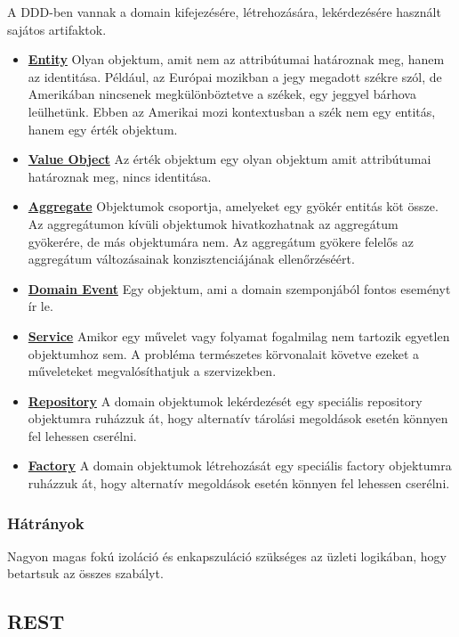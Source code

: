 A DDD-ben vannak a domain kifejezésére, létrehozására, lekérdezésére használt sajátos artifaktok.

\begin{itemize}
    \item \textbf{\underline{Entity}}
    Olyan objektum, amit nem az attribútumai határoznak meg, hanem az identitása.
    Például, az Európai mozikban a jegy megadott székre szól, de Amerikában nincsenek megkülönböztetve a székek, egy jeggyel bárhova leülhetünk.
    Ebben az Amerikai mozi kontextusban a szék nem egy entitás, hanem egy érték objektum.
    \item \textbf{\underline{Value Object}}
    Az érték objektum egy olyan objektum amit attribútumai határoznak meg, nincs identitása.
    \item \textbf{\underline{Aggregate}}
    Objektumok csoportja, amelyeket egy gyökér entitás köt össze.
    Az aggregátumon kívüli objektumok hivatkozhatnak az aggregátum gyökerére, de más objektumára nem.
    Az aggregátum gyökere felelős az aggregátum változásainak konzisztenciájának ellenőrzéséért.
    \item \textbf{\underline{Domain Event}}
    Egy objektum, ami a domain szemponjából fontos eseményt ír le.
    \item \textbf{\underline{Service}}
    Amikor egy művelet vagy folyamat fogalmilag nem tartozik egyetlen objektumhoz sem.
    A probléma természetes körvonalait követve ezeket a műveleteket megvalósíthatjuk a szervizekben.
    \item \textbf{\underline{Repository}}
    A domain objektumok lekérdezését egy speciális repository objektumra ruházzuk át, hogy alternatív tárolási megoldások esetén könnyen fel lehessen cserélni.
    \item \textbf{\underline{Factory}}
    A domain objektumok létrehozását egy speciális factory objektumra ruházzuk át, hogy alternatív megoldások esetén könnyen fel lehessen cserélni.
\end{itemize}

\subsubsection{Hátrányok}
Nagyon magas fokú izoláció és enkapszuláció szükséges az üzleti logikában, hogy betartsuk az összes szabályt.


\subsection{REST}\label{subsec:rest-architektúra}

